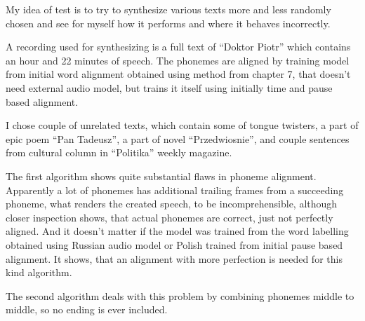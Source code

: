 \documentclass[12pt,a4paper,english]{article}
\begin{document}
My idea of test is to try to synthesize various texts more and less randomly chosen and see for myself how it performs and where it behaves incorrectly. \newline

A recording used for synthesizing is a full text of “Doktor Piotr” which contains an hour and 22 minutes of speech. The phonemes are aligned by training model from initial word alignment obtained using method from chapter 7, that doesn't need external audio model, but trains it itself using initially time and pause based alignment. \newline

I chose couple of unrelated texts, which contain some of tongue twisters, a part of epic poem “Pan Tadeusz”, a part of novel “Przedwiosnie”, and couple sentences from cultural column in “Politika” weekly magazine. \newline
\newline

The first algorithm shows quite substantial flaws in phoneme alignment. Apparently a lot of phonemes has additional trailing frames from a succeeding phoneme, what renders the created speech, to be incomprehensible, although closer inspection shows, that actual phonemes are correct, just not perfectly aligned. And it doesn't matter if the model was trained from the word labelling obtained using Russian audio model or Polish trained from initial pause based alignment. It shows, that an alignment with more perfection is needed for this kind algorithm. \newline

The second algorithm deals with this problem by combining phonemes middle to middle, so no ending is ever included. 
\end{document}
